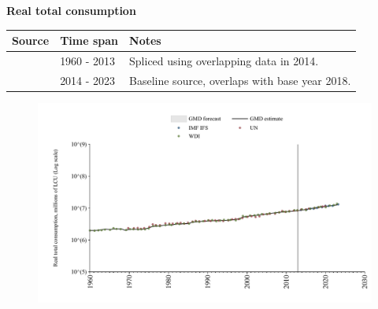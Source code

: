 \documentclass[12pt,a4paper,landscape]{article}
\begin{document}
\begin{adjustbox}{max totalsize={\paperwidth}{\paperheight},center}
\begin{minipage}[t][\textheight][t]{\textwidth}
\vspace*{0.5cm}
{}
\begin{center}
{\Large\bfseries Real total consumption}
\end{center}
\vspace{0.5cm}
\begin{table}[H]
\centering
\small
\begin{tabular}{|l|l|l|}
\hline
\textbf{Source} & \textbf{Time span} & \textbf{Notes} \\
\hline
\rowcolor{white}\cite{WDI}& 1960 - 2013 &Spliced using overlapping data in 2014. \\
\rowcolor{lightgray}\cite{IMF_IFS}& 2014 - 2023 &Baseline source, overlaps with base year 2018. \\
\hline
\end{tabular}
\end{table}
\begin{figure}[H]
\centering
\includegraphics[width=\textwidth,height=0.6\textheight,keepaspectratio]{graphs/SEN_rcons.pdf}
\end{figure}
\end{minipage}
\end{adjustbox}
\end{document}
